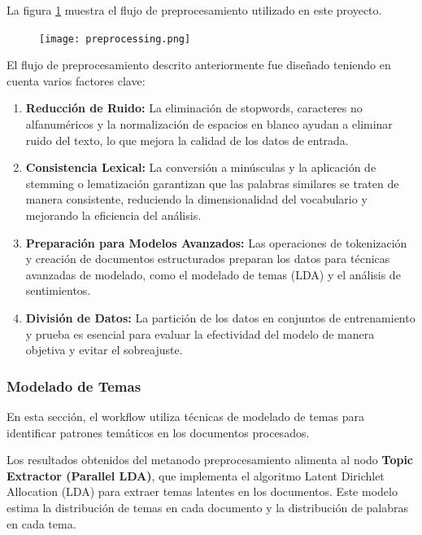 La figura \ref{fig:preprocessing_workflow} muestra el flujo de preprocesamiento utilizado en este proyecto.

\begin{figure}[H]
	\centering
	\texttt{[image: preprocessing.png]}
	\caption[Flujo de Preprocesamiento en KNIME]{}
	\label{fig:preprocessing_workflow}
\end{figure}

El flujo de preprocesamiento descrito anteriormente fue diseñado teniendo en cuenta varios factores clave:

\begin{enumerate}
	\item \textbf{Reducción de Ruido: }La eliminación de stopwords, caracteres no alfanuméricos y la normalización de espacios en blanco ayudan a eliminar ruido del texto, lo que mejora la calidad de los datos de entrada.
	
	\item \textbf{Consistencia Lexical:} La conversión a minúsculas y la aplicación de stemming o lematización garantizan que las palabras similares se traten de manera consistente, reduciendo la dimensionalidad del vocabulario y mejorando la eficiencia del análisis.
	
	\item \textbf{Preparación para Modelos Avanzados:} Las operaciones de tokenización y creación de documentos estructurados preparan los datos para técnicas avanzadas de modelado, como el modelado de temas (LDA) y el análisis de sentimientos.
	
	\item \textbf{División de Datos:} La partición de los datos en conjuntos de entrenamiento y prueba es esencial para evaluar la efectividad del modelo de manera objetiva y evitar el sobreajuste.
\end{enumerate}

\subsubsection{Modelado de Temas}

En esta sección, el workflow utiliza técnicas de modelado de temas para identificar patrones temáticos en los documentos procesados.

Los resultados obtenidos del metanodo preprocesamiento alimenta al nodo \textbf{Topic Extractor (Parallel LDA)}, que implementa el algoritmo Latent Dirichlet Allocation (LDA) para extraer temas latentes en los documentos. Este modelo estima la distribución de temas en cada documento y la distribución de palabras en cada tema.

